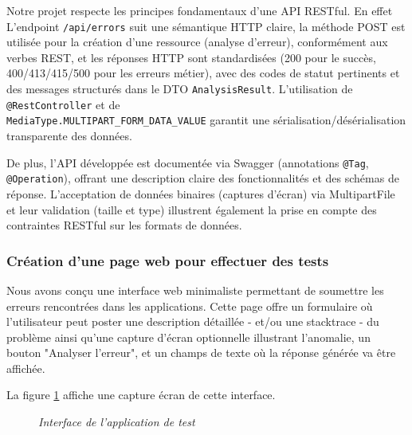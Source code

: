 \documentclass[12pt,a4paper]{report}
\begin{document}
	Notre projet respecte les principes fondamentaux d'une API RESTful. En effet L'endpoint \verb|/api/errors| suit une sémantique HTTP claire, la méthode POST est utilisée pour la création d'une ressource (analyse d'erreur), conformément aux verbes REST, et les réponses HTTP sont standardisées (200 pour le succès, 400/413/415/500 pour les erreurs métier), avec des codes de statut pertinents et des messages structurés dans le DTO \verb|AnalysisResult|. L'utilisation de \verb|@RestController| et de \\ \verb|MediaType.MULTIPART_FORM_DATA_VALUE| garantit une sérialisation/désérialisation transparente des données. \cite{rest}
	
	De plus, l'API développée est documentée via Swagger (annotations \verb|@Tag|, \verb|@Operation|), offrant une description claire des fonctionnalités et des schémas de réponse. L'acceptation de données binaires (captures d'écran) via MultipartFile et leur validation (taille et type) illustrent également la prise en compte des contraintes RESTful sur les formats de données. \cite{swagger}
	
	\subsubsection{Création d'une page web pour effectuer des tests}
	
	Nous avons conçu une interface web minimaliste permettant de soumettre les erreurs rencontrées dans les applications. Cette page offre un formulaire où l'utilisateur peut poster une description détaillée - et/ou une stacktrace  - du problème ainsi qu’une capture d’écran optionnelle illustrant l’anomalie, un bouton "Analyser l'erreur", et un champs de texte où la réponse générée va être affichée.
	
	La figure \ref{fig:interface} affiche une capture écran de cette interface.
	
	\begin{figure}[H]
		\centering
		\caption{\textit{Interface de l'application de test}}
		\label{fig:interface}
	\end{figure}
	
\end{document}
